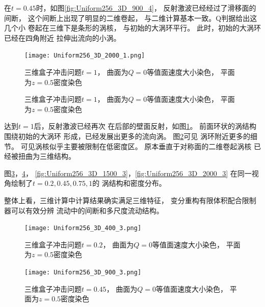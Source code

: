 \documentclass[UTF8,zihao=5]{ctexart} %
\begin{document}
在$t=0.45$时，如图\ref{fig:Uniform256_3D_900_4}，
反射激波已经经过了滑移面的间断，
这个间断上出现了明显的二维卷起，
与二维计算基本一致。Q判据给出这几个小
卷起在三维下是条形的涡核，
与初始的大涡环平行。
此时，初始的大涡环已经在四角附近
拉伸出流向的小涡。


\begin{figure}[htbp]
    \centering
    \texttt{[image: Uniform256\_3D\_2000\_1.png]}  %
    \caption{三维盒子冲击问题$t=1$，
        曲面为$Q=0$等值面速度大小染色，
        平面为$z=0.5$密度染色}
    \label{fig:Uniform256_3D_2000_1}
\end{figure}

\begin{figure}[htbp]
    \centering
    \caption{三维盒子冲击问题$t=1$，
        曲面为$Q=0$等值面速度大小染色，
        平面为$z=0.5$密度染色}
    \label{fig:Uniform256_3D_2000_2}
\end{figure}

达到$t=1$后，反射激波已经再次
在后部的壁面反射，如图\ref{fig:Uniform256_3D_2000_1}。
前面环状的涡结构围绕初始的大涡环
形成，已经发展出更多的流向涡。
图\ref{fig:Uniform256_3D_2000_2}可见
涡环附近更多的细节。
可见涡核似乎主要被限制在低密度区。
原本垂直于对称面的二维卷起涡核
已经被扭曲为三维结构。

图\ref{fig:Uniform256_3D_400_3}，\ref{fig:Uniform256_3D_900_3}，
\ref{fig:Uniform256_3D_1500_3}，\ref{fig:Uniform256_3D_2000_3}
在同一视角绘制了$t=0.2,0.45,0.75,1$的
涡结构和密度分布。

整体上看，三维计算中计算结果确实满足三维特征，
变分重构有限体积配合限制器可以有效分辨
流动中的间断和多尺度流动结构。



\begin{figure}[htbp]
    \centering
    \texttt{[image: Uniform256\_3D\_400\_3.png]}  %
    \caption{三维盒子冲击问题$t=0.2$，
        曲面为$Q=0$等值面速度大小染色，
        平面为$z=0.5$密度染色}
    \label{fig:Uniform256_3D_400_3}
\end{figure}

\begin{figure}[htbp]
    \centering
    \texttt{[image: Uniform256\_3D\_900\_3.png]}  %
    \caption{三维盒子冲击问题$t=0.45$，
        曲面为$Q=0$等值面速度大小染色，
        平面为$z=0.5$密度染色}
    \label{fig:Uniform256_3D_900_3}
\end{figure}
\end{document}
